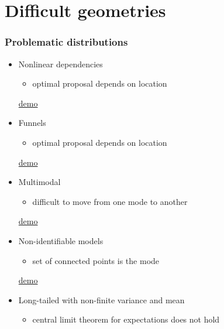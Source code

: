 \documentclass[10pt]{beamer}
\begin{document}
\section{Difficult geometries}
\frame{\sectionpage}

\begin{frame}

\frametitle{Problematic distributions}

  \begin{itemize}
  \item<1-> Nonlinear dependencies
    \begin{itemize}
    \item optimal proposal depends on location
    \end{itemize}
    \begin{center}
      \href{https://chi-feng.github.io/mcmc-demo/app.html?algorithm=RandomWalkMH&target=banana}{demo}
    \end{center}
  \item<2-> Funnels
    \begin{itemize}
    \item optimal proposal depends on location
    \end{itemize}
    \begin{center}
      \href{https://chi-feng.github.io/mcmc-demo/app.html?algorithm=RandomWalkMH&target=funnel}{demo}
    \end{center}
  \item<3-> Multimodal
    \begin{itemize}
    \item difficult to move from one mode to another
    \end{itemize}
        \begin{center}
      \href{https://chi-feng.github.io/mcmc-demo/app.html?algorithm=RandomWalkMH&target=multimodal}{demo}
    \end{center}
  \item<4-> Non-identifiable models
    \begin{itemize}
    \item set of connected points is the mode
    \end{itemize}
        \begin{center}
      \href{https://chi-feng.github.io/mcmc-demo/app.html?algorithm=RandomWalkMH&target=donut}{demo}
    \end{center}
  \item<5-> Long-tailed with non-finite variance and mean
    \begin{itemize}
    \item central limit theorem for expectations does not hold
    \end{itemize}

  \end{itemize}

\end{frame}

\end{document}
